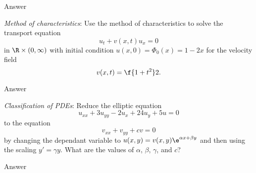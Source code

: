 \documentclass[a4paper]{article}
\begin{document}
Answer



\begin{questionbody}
\textit{Method of characteristics}: Use the method of characteristics to solve the transport equation \[
u_t + v(x, t) u_x = 0
\] in $\R \times (0, \infty)$ with initial condition $u(x, 0) = \Phi_0(x) = 1 - 2x$ for the velocity field \[
v(x, t) = \f{1 + t^2}2.
\]
\end{questionbody}

Answer



\begin{questionbody}
\textit{Classification of PDEs}: Reduce the elliptic equation \[
u_{xx} + 3 u_{yy} - 2 u_x + 24 u_y + 5u = 0
\] to the equation \[
v_{xx} + v_{yy} + cv = 0
\] by changing the dependant variable to $u(x, y) = v(x, y) \e^{\alpha x + \beta y}$ and then using the scaling $y' = \gamma y$. What are the values of $\alpha$, $\beta$, $\gamma$, and $c$?
\end{questionbody}

Answer

\end{document}

